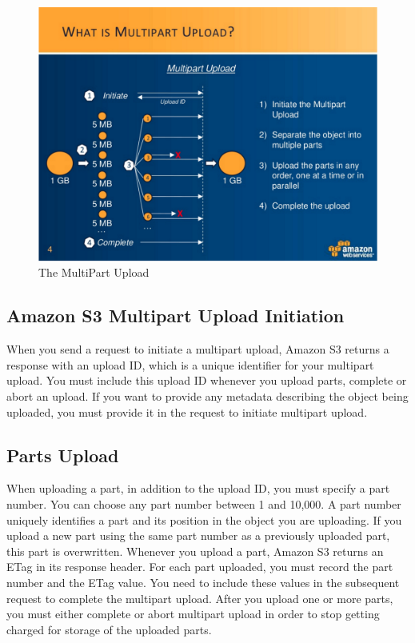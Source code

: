 \begin{figure}[htb] %
 \centering
 \includegraphics[width=1.0\linewidth]{images/chapter2/multipart_upload.png}\hfill
 \caption[Multi part Upload]{The MultiPart Upload}
 \label{fig:fourV}
\end{figure}

\subsection{Amazon S3 Multipart Upload Initiation}
\label{subsec:amazon_S3_multipart_upload_initiation}

When you send a request to initiate a multipart upload, Amazon S3 returns a response with an upload ID, which is a unique identifier for your multipart upload. You must include this upload ID whenever you upload parts, complete or abort an upload. If you want to provide any metadata describing the object being uploaded, you must provide it in the request to initiate multipart upload.


\subsection{Parts Upload}
\label{subsec:parts_upload}

When uploading a part, in addition to the upload ID, you must specify a part number. You can choose any part number between 1 and 10,000. A part number uniquely identifies a part and its position in the object you are uploading. If you upload a new part using the same part number as a previously uploaded part, this part is overwritten. Whenever you upload a part, Amazon S3 returns an ETag in its response header. For each part uploaded, you must record the part number and the ETag value. You need to include these values in the subsequent request to complete the multipart upload.
After you upload one or more parts, you must either complete or abort multipart upload in order to stop getting charged for storage of the uploaded parts. 


